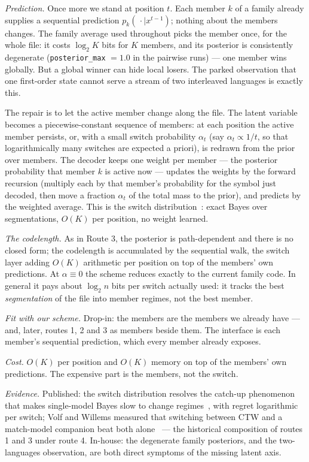 \documentclass[11pt]{article}
\begin{document}
\emph{Prediction.}  Once more we stand at position $t$.  Each member
$k$ of a family already supplies a sequential prediction
$p_k(\,\cdot \mid x^{t-1})$; nothing about the members changes.  The
family average used throughout picks the member once, for the whole
file: it costs $\log_2 K$ bits for $K$ members, and its posterior is
consistently degenerate (\texttt{posterior\_max} $= 1.0$ in the
pairwise runs) --- one member wins globally.  But a global winner can
hide local losers.  The parked observation that one first-order state
cannot serve a stream of two interleaved languages is exactly this.

The repair is to let the active member change along the file.  The
latent variable becomes a piecewise-constant sequence of members: at
each position the active member persists, or, with a small switch
probability $\alpha_t$ (say $\alpha_t \propto 1/t$, so that
logarithmically many switches are expected a priori), is redrawn from
the prior over members.  The decoder keeps one weight per member ---
the posterior probability that member $k$ is active now --- updates
the weights by the forward recursion (multiply each by that member's
probability for the symbol just decoded, then move a fraction
$\alpha_t$ of the total mass to the prior), and predicts by the
weighted average.  This is the switch distribution~\cite{switching}:
exact Bayes over segmentations, $O(K)$ per position, no weight
learned.

\emph{The codelength.}  As in Route 3, the posterior is
path-dependent and there is no closed form; the codelength is
accumulated by the sequential walk, the switch layer adding $O(K)$
arithmetic per position on top of the members' own predictions.  At
$\alpha \equiv 0$ the scheme reduces exactly to the current family
code.  In general it pays about $\log_2 n$ bits per switch actually
used: it tracks the best \emph{segmentation} of the file into member
regimes, not the best member.

\emph{Fit with our scheme.}  Drop-in: the members are the members we
already have --- and, later, routes 1, 2 and 3 as members beside
them.
The interface is each member's sequential prediction, which every
member already exposes.

\emph{Cost.}  $O(K)$ per position and $O(K)$ memory on top of the
members' own predictions.  The expensive part is the members, not the
switch.

\emph{Evidence.}  Published: the switch distribution resolves the
catch-up phenomenon that makes single-model Bayes slow to change
regimes~\cite{switching}, with regret logarithmic per switch; Volf
and Willems measured that switching between CTW and a match-model
companion beat both alone~\cite{volf} --- the historical composition
of routes 1 and 3 under route 4.  In-house: the degenerate family
posteriors, and the two-languages observation, are both direct
symptoms of the missing latent axis.
\end{document}
